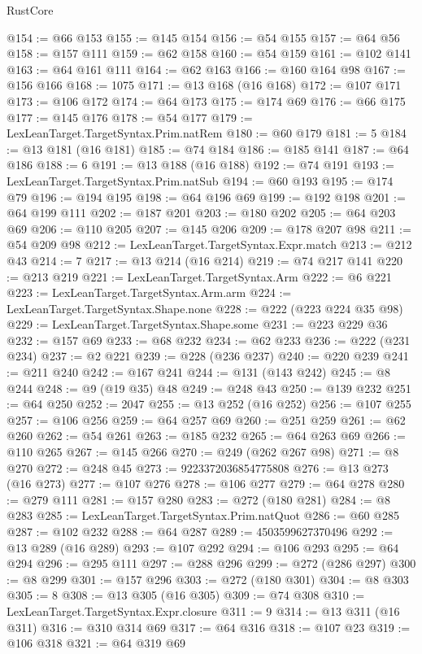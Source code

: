\begin{lexlean}{RustCore}
\begin{coremodule}
@154 := @66 @153
@155 := @145 @154
@156 := @54 @155
@157 := @64 @56
@158 := @157 @111
@159 := @62 @158
@160 := @54 @159
@161 := @102 @141
@163 := @64 @161 @111
@164 := @62 @163
@166 := @160 @164 @98
@167 := @156 @166
@168 := 1075
@171 := @13 @168 (@16 @168)
@172 := @107 @171
@173 := @106 @172
@174 := @64 @173
@175 := @174 @69
@176 := @66 @175
@177 := @145 @176
@178 := @54 @177
@179 := LexLeanTarget.TargetSyntax.Prim.natRem
@180 := @60 @179
@181 := 5
@184 := @13 @181 (@16 @181)
@185 := @74 @184
@186 := @185 @141
@187 := @64 @186
@188 := 6
@191 := @13 @188 (@16 @188)
@192 := @74 @191
@193 := LexLeanTarget.TargetSyntax.Prim.natSub
@194 := @60 @193
@195 := @174 @79
@196 := @194 @195
@198 := @64 @196 @69
@199 := @192 @198
@201 := @64 @199 @111
@202 := @187 @201
@203 := @180 @202
@205 := @64 @203 @69
@206 := @110 @205
@207 := @145 @206
@209 := @178 @207 @98
@211 := @54 @209 @98
@212 := LexLeanTarget.TargetSyntax.Expr.match
@213 := @212 @43
@214 := 7
@217 := @13 @214 (@16 @214)
@219 := @74 @217 @141
@220 := @213 @219
@221 := LexLeanTarget.TargetSyntax.Arm
@222 := @6 @221
@223 := LexLeanTarget.TargetSyntax.Arm.arm
@224 := LexLeanTarget.TargetSyntax.Shape.none
@228 := @222 (@223 @224 @35 @98)
@229 := LexLeanTarget.TargetSyntax.Shape.some
@231 := @223 @229 @36
@232 := @157 @69
@233 := @68 @232
@234 := @62 @233
@236 := @222 (@231 @234)
@237 := @2 @221
@239 := @228 (@236 @237)
@240 := @220 @239
@241 := @211 @240
@242 := @167 @241
@244 := @131 (@143 @242)
@245 := @8 @244
@248 := @9 (@19 @35) @48
@249 := @248 @43
@250 := @139 @232
@251 := @64 @250
@252 := 2047
@255 := @13 @252 (@16 @252)
@256 := @107 @255
@257 := @106 @256
@259 := @64 @257 @69
@260 := @251 @259
@261 := @62 @260
@262 := @54 @261
@263 := @185 @232
@265 := @64 @263 @69
@266 := @110 @265
@267 := @145 @266
@270 := @249 (@262 @267 @98)
@271 := @8 @270
@272 := @248 @45
@273 := 9223372036854775808
@276 := @13 @273 (@16 @273)
@277 := @107 @276
@278 := @106 @277
@279 := @64 @278
@280 := @279 @111
@281 := @157 @280
@283 := @272 (@180 @281)
@284 := @8 @283
@285 := LexLeanTarget.TargetSyntax.Prim.natQuot
@286 := @60 @285
@287 := @102 @232
@288 := @64 @287
@289 := 4503599627370496
@292 := @13 @289 (@16 @289)
@293 := @107 @292
@294 := @106 @293
@295 := @64 @294
@296 := @295 @111
@297 := @288 @296
@299 := @272 (@286 @297)
@300 := @8 @299
@301 := @157 @296
@303 := @272 (@180 @301)
@304 := @8 @303
@305 := 8
@308 := @13 @305 (@16 @305)
@309 := @74 @308
@310 := LexLeanTarget.TargetSyntax.Expr.closure
@311 := 9
@314 := @13 @311 (@16 @311)
@316 := @310 @314 @69
@317 := @64 @316
@318 := @107 @23
@319 := @106 @318
@321 := @64 @319 @69

\end{coremodule}
\end{lexlean}
